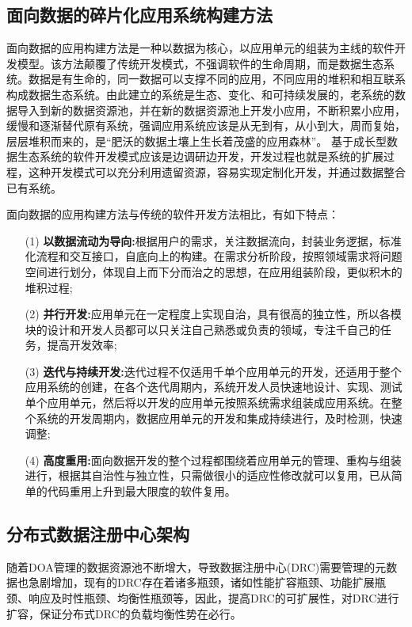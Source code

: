\documentclass[article]{BJTU-thesis}
\begin{document}
	\subsection{面向数据的碎片化应用系统构建方法}
	面向数据的应用构建方法是一种以数据为核心，以应用单元的组装为主线的软件开发模型。该方法颠覆了传统开发模式，不强调软件的生命周期，而是数据生态系统。数据是有生命的，同一数据可以支撑不同的应用，不同应用的堆积和相互联系构成数据生态系统。由此建立的系统是生态、变化、和可持续发展的，老系统的数据导入到新的数据资源池，并在新的数据资源池上开发小应用，不断积累小应用，缓慢和逐渐替代原有系统，强调应用系统应该是从无到有，从小到大，周而复始，层层堆积而来的，是“肥沃的数据土壤上生长着茂盛的应用森林”。 基于成长型数据生态系统的软件开发模式应该是边调研边开发，开发过程也就是系统的扩展过程，这种开发模式可以充分利用遗留资源，容易实现定制化开发，并通过数据整合已有系统。
	
	面向数据的应用构建方法与传统的软件开发方法相比，有如下特点：
	\begin{enumerate}
		\item[(1)]  \textbf{以数据流动为导向:}根据用户的需求，关注数据流向，封装业务逻据，标准化流程和交互接口，自底向上的构建。在需求分析阶段，按照领域需求将问题空间进行划分，体现自上而下分而治之的思想，在应用组装阶段，更似积木的堆积过程;
		\item[(2)]  \textbf{并行开发:}应用单元在一定程度上实现自治，具有很高的独立性，所以各模块的设计和开发人员都可以只关注自己熟悉或负责的领域，专注千自己的任务，提高开发效率;
		\item[(3)]  \textbf{迭代与持续开发:}迭代过程不仅适用千单个应用单元的开发，还适用于整个应用系统的创建，在各个迭代周期内，系统开发人员快速地设计、实现、测试单个应用单元，然后将以开发的应用单元按照系统需求组装成应用系统。在整个系统的开发周期内，数据应用单元的开发和集成持续进行，及时检测，快速调整;
		\item[(4)] \textbf{高度重用:}面向数据开发的整个过程都围绕着应用单元的管理、重构与组装进行，根据其自治性与独立性，只需做很小的适应性修改就可以复用，已从简单的代码重用上升到最大限度的软件复用。
	\end{enumerate}

	\subsection{分布式数据注册中心架构}
	随着DOA管理的数据资源池不断增大，导致数据注册中心(DRC)需要管理的元数据也急剧增加，现有的DRC存在着诸多瓶颈，诸如性能扩容瓶颈、功能扩展瓶颈、响应及时性瓶颈、均衡性瓶颈等，因此，提高DRC的可扩展性，对DRC进行扩容，保证分布式DRC的负载均衡性势在必行。
	
\end{document}
